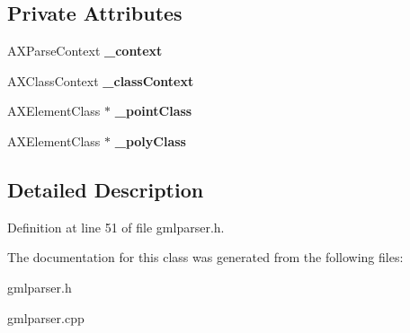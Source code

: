 \subsection*{Private Attributes}
\begin{DoxyCompactItemize}
\item 
\hypertarget{classSigSpatial2013_1_1GMLParser_aa69cab81d25d69d5285a38ff98239596}{A\-X\-Parse\-Context {\bfseries \-\_\-context}}\label{classSigSpatial2013_1_1GMLParser_aa69cab81d25d69d5285a38ff98239596}

\item 
\hypertarget{classSigSpatial2013_1_1GMLParser_ab96f62ed746bc716f928d2875ad68ca0}{A\-X\-Class\-Context {\bfseries \-\_\-class\-Context}}\label{classSigSpatial2013_1_1GMLParser_ab96f62ed746bc716f928d2875ad68ca0}

\item 
\hypertarget{classSigSpatial2013_1_1GMLParser_a302a903e23e6c3660c5d06fcb944cf5d}{A\-X\-Element\-Class $\ast$ {\bfseries \-\_\-point\-Class}}\label{classSigSpatial2013_1_1GMLParser_a302a903e23e6c3660c5d06fcb944cf5d}

\item 
\hypertarget{classSigSpatial2013_1_1GMLParser_a267244fa4122657b4a113f9d29378321}{A\-X\-Element\-Class $\ast$ {\bfseries \-\_\-poly\-Class}}\label{classSigSpatial2013_1_1GMLParser_a267244fa4122657b4a113f9d29378321}

\end{DoxyCompactItemize}


\subsection{Detailed Description}


Definition at line 51 of file gmlparser.\-h.



The documentation for this class was generated from the following files\-:\begin{DoxyCompactItemize}
\item 
gmlparser.\-h\item 
gmlparser.\-cpp\end{DoxyCompactItemize}
